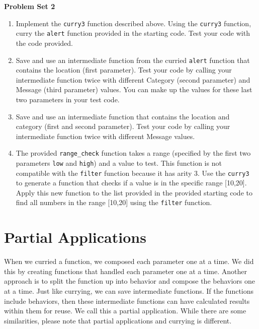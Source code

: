 \documentclass[
]{book}
\providecommand{\tightlist}{%
  \setlength{\itemsep}{0pt}\setlength{\parskip}{0pt}}
\begin{document}
\begin{problembox}

\textbf{Problem Set 2}

\begin{enumerate}
\def\labelenumi{\arabic{enumi}.}
\tightlist
\item
  Implement the \texttt{curry3} function described above. Using the \texttt{curry3} function, curry the \texttt{alert} function provided in the starting code. Test your code with the code provided.
\item
  Save and use an intermediate function from the curried \texttt{alert} function that contains the location (first parameter). Test your code by calling your intermediate function twice with different Category (second parameter) and Message (third parameter) values. You can make up the values for these last two parameters in your test code.
\item
  Save and use an intermediate function that contains the location and category (first and second parameter). Test your code by calling your intermediate function twice with different Message values.
\item
  The provided \texttt{range\_check} function takes a range (specified by the first two parameters \texttt{low} and \texttt{high}) and a value to test. This function is not compatible with the \texttt{filter} function because it has arity 3. Use the \texttt{curry3} to generate a function that checks if a value is in the specific range {[}10,20{]}. Apply this new function to the list provided in the provided starting code to find all numbers in the range {[}10,20{]} using the \texttt{filter} function.
\end{enumerate}

\end{problembox}

\hypertarget{partial-applications}{%
\section{Partial Applications}\label{partial-applications}}

When we curried a function, we composed each parameter one at a time. We did this by creating functions that handled each parameter one at a time. Another approach is to split the function up into behavior and compose the behaviors one at a time. Just like currying, we can save intermediate functions. If the functions include behaviors, then these intermediate functions can have calculated results within them for reuse. We call this a partial application. While there are some similarities, please note that partial applications and currying is different.
\end{document}
